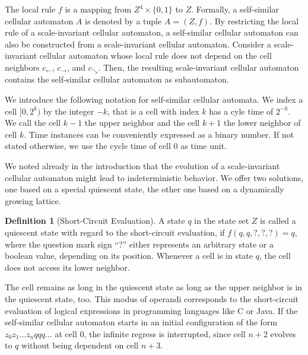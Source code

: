 \documentclass[pre,showpacs,showkeys,preprint]{revtex4}
\theoremstyle{definition}
\newtheorem{defn}{Definition}
\begin{document}
The local rule $f$ is a mapping from $Z^4 \times \{0,1\}$ to $Z$.
Formally, a self-similar cellular automaton $A$ is denoted by a tuple $A = (Z, f)$.
By restricting the local rule of a scale-invariant cellular automaton, a self-similar cellular automaton can also be constructed from a scale-invariant cellular automaton.
Consider a scale-invariant cellular automaton whose local rule does not depend on
the cell neighbors $c_\leftarrow$, $c_\rightarrow$, and $c_\searrow$.
Then, the resulting scale-invariant cellular automaton contains the self-similar cellular automaton as subautomaton.

We introduce the following notation for self-similar cellular automata.
We index a cell $[0, 2^k)$ by the integer $-k$, that is a cell with index $k$ has a cyle time of $2^{-k}$.
We call the cell $k - 1$ the upper neighbor and the cell $k + 1$ the lower neighbor of cell $k$.
Time instances can be conveniently expressed as a binary number.
If not stated otherwise, we use the cycle time of cell 0 as time unit.

We noted already in the introduction that the evolution of a scale-invariant cellular automaton might lead to indeterministic behavior.
We offer two solutions, one based on a special quiescent state, the other one based on a dynamically growing lattice.

\begin{defn}[Short-Circuit Evaluation]
A state $q$ in the state set $Z$ is called a quiescent state with regard to the short-circuit evaluation, if
$f(q, q, ?, ?, ?) =  q$, where the question mark sign ``$?$'' either represents an arbitrary state or a boolean value, depending on
its position.
Whenever a cell is in state $q$, the cell does not access its lower neighbor.
\end{defn}

The cell remains as long in the quiescent state as long as the upper neighbor is in the quiescent state, too.
This modus of operandi corresponds to the short-circuit evaluation of logical expressions in programming
languages like C or Java.
If the self-similar cellular automaton starts in an initial configuration of the form $z_0 z_1 \ldots z_n q q q\ldots$ at cell $0$, the infinite
regress is interrupted, since cell $n+2$ evolves to $q$ without being dependent on cell $n+3$.
\end{document}
